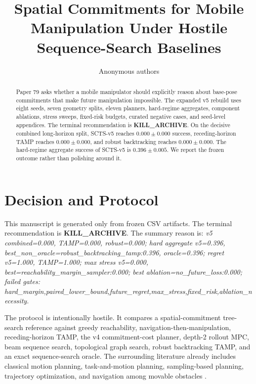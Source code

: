 \documentclass{article}
\title{Spatial Commitments for Mobile Manipulation Under Hostile Sequence-Search Baselines}
\author{Anonymous authors}
\begin{document}
\maketitle

\begin{abstract}
Paper 79 asks whether a mobile manipulator should explicitly reason about base-pose commitments that make future manipulation impossible. The expanded v5 rebuild uses eight seeds, seven geometry splits, eleven planners, hard-regime aggregates, component ablations, stress sweeps, fixed-risk budgets, curated negative cases, and seed-level appendices. The terminal recommendation is \textbf{KILL\_ARCHIVE}. On the decisive combined long-horizon split, SCTS-v5 reaches $0.000\pm0.000$ success, receding-horizon TAMP reaches $0.000\pm0.000$, and robust backtracking reaches $0.000\pm0.000$. The hard-regime aggregate success of SCTS-v5 is $0.396\pm0.005$. We report the frozen outcome rather than polishing around it.
\end{abstract}

\section{Decision and Protocol}
This manuscript is generated only from frozen CSV artifacts. The terminal recommendation is \textbf{KILL\_ARCHIVE}. The summary reason is: \emph{v5 combined=0.000, TAMP=0.000, robust=0.000; hard aggregate v5=0.396, best\_non\_oracle=robust\_backtracking\_tamp:0.396, oracle=0.396; regret v5=1.000, TAMP=1.000; max stress v5=0.000, best=reachability\_margin\_sampler:0.000; best ablation=no\_future\_loss:0.000; failed gates: hard\_margin,paired\_lower\_bound,future\_regret,max\_stress,fixed\_risk,ablation\_necessity.}

The protocol is intentionally hostile. It compares a spatial-commitment tree-search reference against greedy reachability, navigation-then-manipulation, receding-horizon TAMP, the v4 commitment-cost planner, depth-2 rollout MPC, beam sequence search, topological graph search, robust backtracking TAMP, and an exact sequence-search oracle. The surrounding literature already includes classical motion planning, task-and-motion planning, sampling-based planning, trajectory optimization, and navigation among movable obstacles \citep{lavalle2006planning,kaelbling2011tamp,garrett2021pddlstream,kavraki1996prm,lavalle1998rrt,ratliff2009chomp,kalakrishnan2011stomp,stilman2007navigation}.
\end{document}
